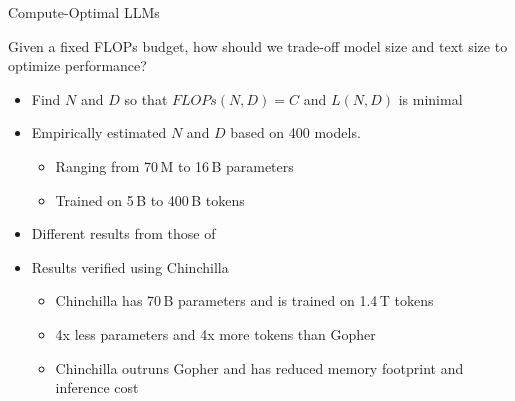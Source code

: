 \begin{vbframe}{Compute-Optimal LLM\MakeLowercase{s}}
\href{https://arxiv.org/abs/2203.15556}{}

Given a fixed FLOPs budget, how should we trade-off model size and text size to optimize performance? 

\vfill

\begin{itemize}

	\item Find $N$ and $D$ so that $FLOPs(N,D) = C$ and $L(N,D)$ is minimal

	\item Empirically estimated $N$ and $D$ based on 400 models. 
	\begin{itemize}
	\item Ranging from 70\,M to 16\,B parameters
	\item Trained on 5\,B to 400\,B tokens
	\end{itemize}

	\item Different results from those of \href{https://arxiv.org/abs/2001.08361}{} 
	\item Results verified using Chinchilla
	\begin{itemize}
	\item Chinchilla has 70\,B parameters and is trained on 1.4\,T tokens
	\item 4x less parameters and 4x more tokens than Gopher
	\item Chinchilla outruns Gopher and has reduced memory footprint and inference cost 
	\end{itemize}

\end{itemize}

\vfill

\end{vbframe}


